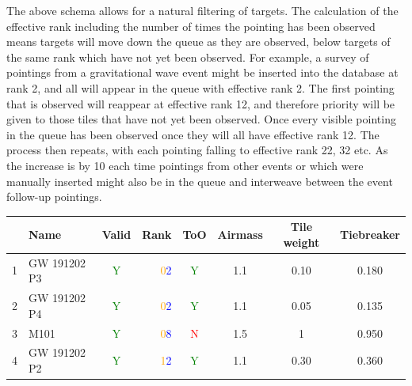\begin{colsection}
\begin{colsection}
\begin{itemize}
\end{itemize}

The above schema allows for a natural filtering of targets. The calculation of the effective rank including the number of times the pointing has been observed means targets will move down the queue as they are observed, below targets of the same rank which have not yet been observed. For example, a survey of pointings from a gravitational wave event might be inserted into the database at rank 2, and all will appear in the queue with effective rank 2. The first pointing that is observed will reappear at effective rank 12, and therefore priority will be given to those tiles that have not yet been observed. Once every visible pointing in the queue has been observed once they will all have effective rank 12. The process then repeats, with each pointing falling to effective rank 22, 32 etc. As the increase is by 10 each time pointings from other events or which were manually inserted might also be in the queue and interweave between the event follow-up pointings.

\newpage


\begin{table}[t]
    \begin{center}
        \begin{tabular}{c|l|crc|ccc} %
            & Name & Valid & Rank & ToO & Airmass & Tile weight & Tiebreaker
            \\
            \midrule
            1 &
            GW 191202 P3 &
            \textcolor{Green}{Y} &
            \textcolor{Orange}{0}\textcolor{Blue}{2} &
            \textcolor{Green}{Y} &
            1.1 &
            0.10 &
            0.180 \\

            2 &
            GW 191202 P4 &
            \textcolor{Green}{Y} &
            \textcolor{Orange}{0}\textcolor{Blue}{2} &
            \textcolor{Green}{Y} &
            1.1 &
            0.05 &
            0.135 \\

            3 &
            M101 &
            \textcolor{Green}{Y} &
            \textcolor{Orange}{0}\textcolor{Blue}{8} &
            \textcolor{Red}{N} &
            1.5 &
            1 &
            0.950 \\

            4 &
            GW 191202 P2 &
            \textcolor{Green}{Y} &
            \textcolor{Orange}{1}\textcolor{Blue}{2} &
            \textcolor{Green}{Y} &
            1.1 &
            0.30 &
            0.360 \\


\end{tabular}
\end{center}
\end{table}
\end{colsection}
\end{colsection}
